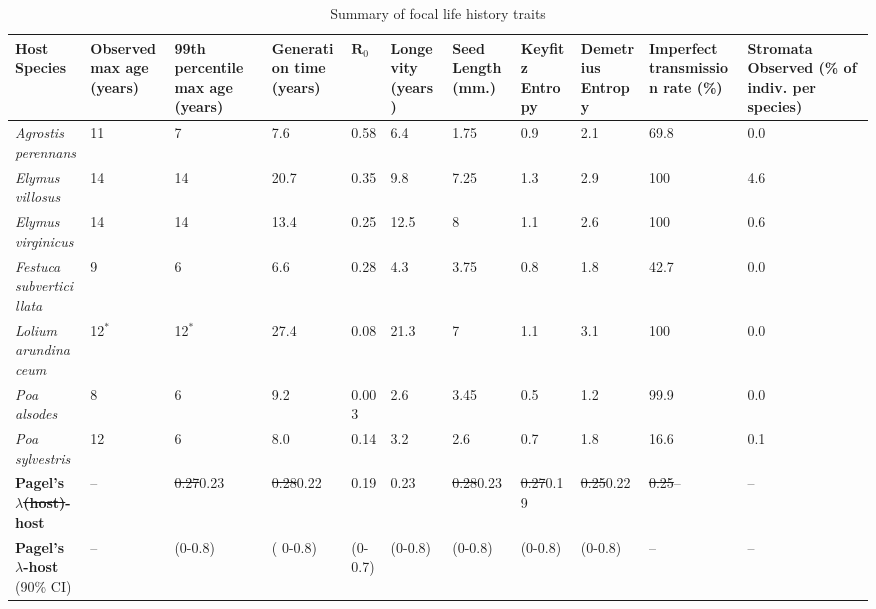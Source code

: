 \documentclass[lineno, sn-basic]{sn-jnl}%
\providecommand{\DIFadd}[1]{{\protect\color{blue}#1}} %
\providecommand{\DIFdel}[1]{{\protect\color{red}\protect\scriptsize\sout{#1}}}
\providecommand{\DIFadd}[1]{{\protect\color{blue}\uwave{#1}}} %
\providecommand{\DIFdel}[1]{{\protect\color{red}\sout{#1}}}                      %
\providecommand{\DIFaddbegin}{} %
\providecommand{\DIFaddend}{} %
\providecommand{\DIFdelbegin}{} %
\providecommand{\DIFdelend}{} %
\newcommand{\DIFscaledelfig}{0.5}
\newlength{\DIFdelgraphicswidth} %
\newlength{\DIFdelgraphicsheight} %
\newcommand{\DIFaddincludegraphics}[2][]{{\color{blue}\fbox{\DIFOincludegraphics[#1]{#2}}}} %
\newcommand{\DIFdelincludegraphics}[2][]{%
\sbox{\DIFdelgraphicsbox}{\DIFOincludegraphics[#1]{#2}}%
\settoboxwidth{\DIFdelgraphicswidth}{\DIFdelgraphicsbox} %
\settoboxtotalheight{\DIFdelgraphicsheight}{\DIFdelgraphicsbox} %
\scalebox{\DIFscaledelfig}{%
\parbox[b]{\DIFdelgraphicswidth}{\usebox{\DIFdelgraphicsbox}\\[-\baselineskip] \rule{\DIFdelgraphicswidth}{0em}}\llap{\resizebox{\DIFdelgraphicswidth}{\DIFdelgraphicsheight}{%
\setlength{\unitlength}{\DIFdelgraphicswidth}%
\begin{picture}(1,1)%
\thicklines\linethickness{2pt} %
{\color[rgb]{1,0,0}\put(0,0){\framebox(1,1){}}}%
{\color[rgb]{1,0,0}\put(0,0){\line( 1,1){1}}}%
{\color[rgb]{1,0,0}\put(0,1){\line(1,-1){1}}}%
\end{picture}%
}\hspace*{3pt}}} %
} %
\DeclareRobustCommand{\DIFaddbegin}{\DIFOaddbegin \let\includegraphics\DIFaddincludegraphics} %
\DeclareRobustCommand{\DIFaddend}{\DIFOaddend \let\includegraphics\DIFOincludegraphics} %
\DeclareRobustCommand{\DIFdelbegin}{\DIFOdelbegin \let\includegraphics\DIFdelincludegraphics} %
\DeclareRobustCommand{\DIFdelend}{\DIFOaddend \let\includegraphics\DIFOincludegraphics} %
\begin{document}
\begin{table}\centering
	\caption{Summary of focal life history traits }
	\setlength{\tabcolsep}{4pt}
	\DIFdelbegin %
\DIFdelend \DIFaddbegin \begin{tabular}{lp{2cm}p{1.7cm}p{1.5cm}p{1cm}p{1.2cm}p{1.2cm}p{.9cm}p{1.2cm}p{1.5cm}p{1.6cm}}
		\DIFaddend 

		Host Species &\raggedright Observed max age (years)& \raggedright 99th percentile max age (years)&Generation time (years) & $\mathbf{R}_0$ &Longevity (years)&Seed Length (mm.)&\raggedright Keyfitz Entropy&\raggedright Demetrius Entropy&\raggedright Imperfect transmission rate (\%) & Stromata Observed (\% of indiv. per species)\\
		\midrule
		\emph{Agrostis perennans} &11&7&7.6&0.58&6.4&1.75&0.9&2.1&69.8&0.0\\
		\emph{Elymus villosus} &14&14&20.7&0.35&9.8&7.25&1.3&2.9&100&4.6\\
		\emph{Elymus virginicus} &14&14&13.4&0.25&12.5&8&1.1&2.6&100&0.6\\
		\emph{Festuca subverticillata} &9&6&6.6&0.28&4.3&3.75&0.8&1.8&42.7&0.0\\
		\emph{Lolium arundinaceum} &12$^*$&12$^*$&27.4&0.08&21.3&7&1.1&3.1&100&0.0\\
		\emph{Poa alsodes} &8&6&9.2&0.003&2.6&3.45&0.5&1.2&99.9&0.0\\
		\emph{Poa sylvestris}&12&6&8.0&0.14&3.2&2.6&0.7&1.8&16.6&0.1\\
		\midrule
		\textbf{Pagel's $\lambda$\DIFdelbegin \DIFdel{(host)}\DIFdelend \DIFaddbegin \DIFadd{-host}\DIFaddend } &--&\DIFdelbegin \DIFdel{0.27}\DIFdelend \DIFaddbegin \DIFadd{0.23}\DIFaddend &\DIFdelbegin \DIFdel{0.28}\DIFdelend \DIFaddbegin \DIFadd{0.22}\DIFaddend &\DIFaddbegin \DIFadd{0.19}&\DIFaddend 0.23&\DIFdelbegin \DIFdel{0.28}\DIFdelend \DIFaddbegin \DIFadd{0.23}\DIFaddend &\DIFdelbegin \DIFdel{0.27}\DIFdelend \DIFaddbegin \DIFadd{0.19}\DIFaddend &\DIFdelbegin \DIFdel{0.25}\DIFdelend \DIFaddbegin \DIFadd{0.22}\DIFaddend &\DIFdelbegin \DIFdel{0.25}\DIFdelend \DIFaddbegin \DIFadd{--}\DIFaddend &--\DIFaddbegin \\
		\textbf{\DIFadd{Pagel's $\lambda$-host}} \DIFadd{(90\% CI)}\DIFaddend &--\DIFaddbegin &\DIFadd{(0-0.8)}&\DIFadd{( 0-0.8)}& \DIFadd{(0-0.7)}&\DIFadd{(0-0.8)}&\DIFadd{(0-0.8)}&\DIFadd{(0-0.8)}&\DIFadd{(0-0.8)}&\DIFadd{--}&\DIFadd{--}\DIFaddend \\

\end{tabular}
\end{table}
\end{document}
